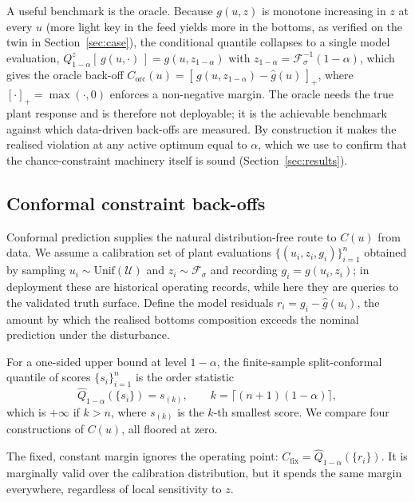 \documentclass[review,times]{elsarticle}
\begin{document}
A useful benchmark is the oracle. Because $g(u,z)$ is monotone increasing in $z$ at every $u$
(more light key in the feed yields more in the bottoms, as verified on the twin in
Section~\ref{sec:case}), the conditional quantile collapses to a single model evaluation,
$Q^{z}_{1-\alpha}[\,g(u,\cdot)\,] = g(u,z_{1-\alpha})$ with
$z_{1-\alpha}=\mathcal F_\sigma^{-1}(1-\alpha)$, which gives the oracle back-off
$C_{\mathrm{orc}}(u)=[\,g(u,z_{1-\alpha})-\hat g(u)\,]_+$, where $[\cdot]_+=\max(\cdot,0)$
enforces a non-negative margin. The oracle needs the true plant response and is therefore not
deployable; it is the achievable benchmark against which data-driven back-offs are measured.
By construction it makes the realised violation at any active optimum equal to $\alpha$,
which we use to confirm that the chance-constraint machinery itself is sound
(Section~\ref{sec:results}).

\subsection{Conformal constraint back-offs}
\label{sec:methods-backoffs}

Conformal prediction supplies the natural distribution-free route to $C(u)$ from data. We
assume a calibration set of plant evaluations $\{(u_i,z_i,g_i)\}_{i=1}^{n}$ obtained by
sampling $u_i\sim\mathrm{Unif}(\mathcal U)$ and $z_i\sim\mathcal F_\sigma$ and recording
$g_i=g(u_i,z_i)$; in deployment these are historical operating records, while here they are
queries to the validated truth surface. Define the model residuals $r_i=g_i-\hat g(u_i)$,
the amount by which the realised bottoms composition exceeds the nominal prediction under the
disturbance.

For a one-sided upper bound at level $1-\alpha$, the finite-sample split-conformal quantile
of scores $\{s_i\}_{i=1}^n$ is the order statistic
\begin{equation}
\widehat Q_{1-\alpha}(\{s_i\}) = s_{(k)},\qquad
k=\big\lceil (n+1)(1-\alpha)\big\rceil ,
\label{eq:quantile}
\end{equation}
which is $+\infty$ if $k>n$, where $s_{(k)}$ is the $k$-th smallest score. We compare four
constructions of $C(u)$, all floored at zero.

The fixed, constant margin ignores the operating point:
$C_{\mathrm{fix}}=\widehat Q_{1-\alpha}(\{r_i\})$. It is marginally valid over the
calibration distribution, but it spends the same margin everywhere, regardless of local
sensitivity to $z$.
\end{document}
